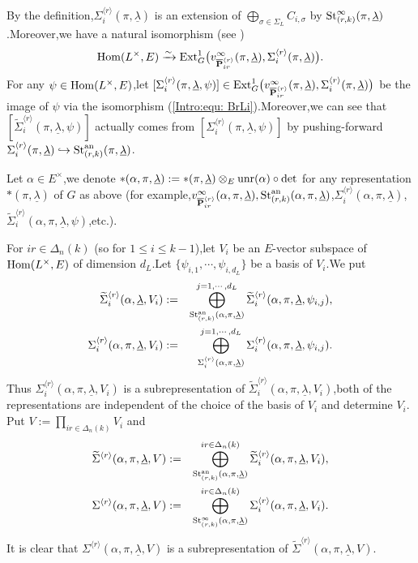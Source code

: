\documentclass[SecEq,CM,GP]{degruyter-crelle} %
\theoremstyle{plain}
\newcommand{\ana}{{\rm an}}
\newcommand{\ext}{{\rm Ext}}
\newcommand{\homo}{{\rm Hom}}
\newcommand{\lrr}{{\langle r\rangle}}
\newcommand{\op}{{\overline{{\mathbf{P}}}}}
\newcommand{\st}{{\rm St}}
\newcommand{\unr}{{\rm unr}}
\newcommand{\ul}{\underline}
\begin{document}
By the definition,\;$\Sigma_i^{\lrr}(\pi,\ul{\lambda})$ is an extension of $\bigoplus_{\sigma\in \Sigma_L}C_{i,\sigma}$ by $\st_{(r,k)}^{\infty}(\pi,\ul{\lambda})$.\;Moreover,\;we have a natural isomorphism (see \cite[Proposition 5.34]{2022ext1hyq})
\begin{equation}\label{Intro:equ: BrLi}
\homo(L^\times,E)\xrightarrow{\sim}  \ext^1_G\big(v_{\op^{\lrr}_{{ir}}}^{\infty}(\pi,\ul{\lambda}), \Sigma_{i}^{\lrr}(\pi,\ul{\lambda})\big).
\end{equation}
For any $\psi \in \homo(L^{\times}, E)$,\;let  $[\Sigma_i^{\lrr}(\pi,\ul{\lambda}, \psi)]\in\ext^1_G\big(v_{\op^{\lrr}_{{ir}}}^{\infty}(\pi,\ul{\lambda}), \Sigma_{i}^{\lrr}(\pi,\ul{\lambda})\big)
$ be the 
image of $\psi$ via the isomorphism (\ref{Intro:equ: BrLi}).\;Moreover,\;we can see that $[\widetilde{{\Sigma}}_i^{\lrr}(\pi,\ul{\lambda}, \psi)]$ actually comes from $[\Sigma_i^{\lrr}(\pi,\ul{\lambda}, \psi)]$ by pushing-forward $\Sigma_{i}^{\lrr}(\pi,\ul{\lambda})\hookrightarrow \st_{(r,k)}^{\ana}(\pi,\ul{\lambda})$.\;

Let $\alpha\in E^\times$,\;we denote  $\ast(\alpha,\pi,\ul{\lambda}):=\ast(\pi,\ul{\lambda})\otimes_E\unr(\alpha)\circ\det$ for any representation $\ast(\pi,\ul{\lambda})$ of $G$ as above (for example,\;$v_{\op^{\lrr}_{ir}}^{\infty}(\alpha,\pi,\ul{\lambda}), \st_{(r,k)}^{\ana}(\alpha,\pi,\ul{\lambda})$,\;$\Sigma_{i}^{\lrr}(\alpha,\pi,\ul{\lambda})$,\;$\widetilde{{\Sigma}}_i^{\lrr}(\alpha,\pi,\ul{\lambda}, \psi)$,\;etc.).\;

For $ir\in \Delta_n(k)$ (so for $1\leq i\leq k-1$),\;let $V_i$ be an $E$-vector subspace of $\homo(L^\times,E)$ of dimension $d_L$.\;Let $\{\psi_{i,1}, \cdots, \psi_{i,d_L}\}$ be a basis of $V_i$.\;We put
\begin{eqnarray*}
\widetilde{\Sigma}_i^{\lrr}(\alpha,\ul{\lambda}, V_i)&:=&\bigoplus_{\st_{(r,k)}^{\ana}(\alpha,\pi, \ul{\lambda})}^{j=1,\cdots, d_L} \widetilde{\Sigma}_i^{\lrr}(\alpha,\pi, \ul{\lambda}, \psi_{i,j}), \\
\Sigma_i^{\lrr}(\alpha,\pi,\ul{\lambda}, V_i)&:=&\bigoplus_{\Sigma_i^{\lrr}(\alpha,\pi, \ul{\lambda})}^{j=1,\cdots, d_L} \Sigma_i^{\lrr}(\alpha,\pi,\ul{\lambda}, \psi_{i,j}).
\end{eqnarray*}
Thus $\Sigma_i^{\lrr}(\alpha,\pi,\ul{\lambda}, V_i)$ is a subrepresentation of $\widetilde{\Sigma}_i^{\lrr}(\alpha,\pi, \ul{\lambda}, V_i)$,\;both of the representations are independent of the choice of the basis of $V_i$ and determine $V_i$. Put $V:=\prod_{ir\in \Delta_n(k)}V_i$ and
\begin{eqnarray*}
\widetilde{\Sigma}^{\lrr}(\alpha,\pi,\ul{\lambda}, V)&:=&\bigoplus_{\st_{(r,k)}^{\ana}(\alpha,\pi, \ul{\lambda})}^{ir\in \Delta_n(k)} \widetilde{\Sigma}_i^{\lrr}(\alpha,\pi,\ul{\lambda}, V_i), \\
\Sigma^{\lrr}(\alpha,\pi,\ul{\lambda}, V)&:=&\bigoplus_{\st_{(r,k)}^{\infty}(\alpha,\pi, \ul{\lambda})}^{ir\in \Delta_n(k)} \Sigma_i^{\lrr}(\alpha,\pi, \ul{\lambda}, V_i).
\end{eqnarray*}
It is clear that $\Sigma^{\lrr}(\alpha,\pi,\ul{\lambda}, V)$ is a subrepresentation of $ \widetilde{\Sigma}^{\lrr}(\alpha,\pi,\ul{\lambda}, V)$.\;
\end{document}
